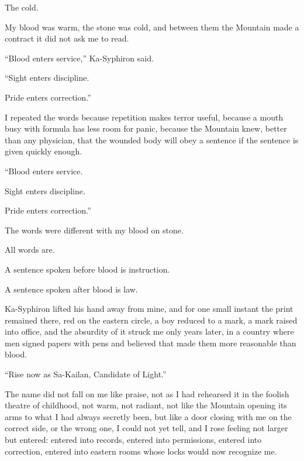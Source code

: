 The cold.\par

My blood was warm, the stone was cold, and between them the Mountain made a contract it did not ask me to read.\par

“Blood enters service,” Ka-Syphiron said.\par

“Sight enters discipline.\par

Pride enters correction.”\par

I repeated the words because repetition makes terror useful, because a mouth busy with formula has less 
room for panic, because the Mountain knew, better than any physician, that the wounded body will obey a 
sentence if the sentence is given quickly enough.\par

“Blood enters service.\par
Sight enters discipline.\par
Pride enters correction.”\par

The words were different with my blood on stone.\par

All words are.\par

A sentence spoken before blood is instruction.\par

A sentence spoken after blood is law.\par

Ka-Syphiron lifted his hand away from mine, and for one small instant the print remained there, red on the eastern circle, a boy reduced to a mark, a mark raised into office, and the absurdity of it struck me only years later, in a country where men signed papers with pens and believed that made them more reasonable than blood.\par

“Rise now as Sa-Kailan, Candidate of Light.”\par

The name did not fall on me like praise, not as I had rehearsed it in the foolish theatre of childhood, not warm, not radiant, not like the Mountain opening its arms to what I had always secretly been, but like a door closing with me on the correct side, or the wrong one, I could not yet tell, and I rose feeling not larger but entered: entered into records, entered into permissions, entered into correction, entered into eastern rooms whose locks would now recognize me.\par

